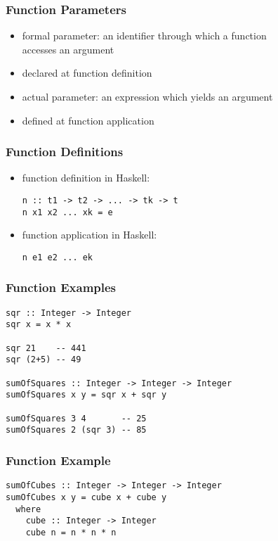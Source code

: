 \documentclass[dvipsnames]{beamer}
\theoremstyle{plain}
\begin{document}
\begin{frame}
  \frametitle{Function Parameters}

  \begin{itemize}
    \item \alert{formal parameter}: an identifier through which a function\\
      accesses an argument
    \item declared at function definition

    \pause
    \medskip
    \item \alert{actual parameter}: an expression which yields an argument
    \item defined at function application
  \end{itemize}
\end{frame}

\begin{frame}[fragile]
  \frametitle{Function Definitions}

  \begin{itemize}
    \item function definition in Haskell:
    \smallskip
    \begin{lstlisting}
n :: t1 -> t2 -> ... -> tk -> t
n x1 x2 ... xk = e
    \end{lstlisting}

    \pause
    \bigskip
    \item function application in Haskell:
    \smallskip
    \begin{lstlisting}
n e1 e2 ... ek
    \end{lstlisting}
  \end{itemize}
\end{frame}

\begin{frame}[fragile]
  \frametitle{Function Examples}

  \begin{lstlisting}
sqr :: Integer -> Integer
sqr x = x * x

sqr 21    -- 441
sqr (2+5) -- 49

sumOfSquares :: Integer -> Integer -> Integer
sumOfSquares x y = sqr x + sqr y

sumOfSquares 3 4       -- 25
sumOfSquares 2 (sqr 3) -- 85
  \end{lstlisting}
\end{frame}

\begin{frame}[fragile]
  \frametitle{Function Example}

  \begin{lstlisting}
sumOfCubes :: Integer -> Integer -> Integer
sumOfCubes x y = cube x + cube y
  where
    cube :: Integer -> Integer
    cube n = n * n * n
  \end{lstlisting}
\end{frame}
\end{document}

